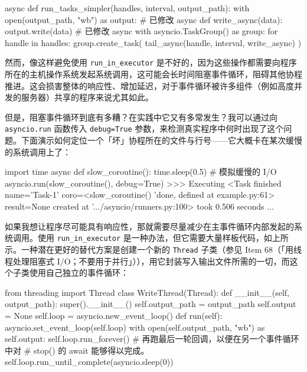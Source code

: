 \begin{codebox}[python]
async def run_tasks_simpler(handles, interval, output_path):
    with open(output_path, "wb") as output:  # 已修改
        async def write_async(data):
            output.write(data)               # 已修改
        async with asyncio.TaskGroup() as group:
            for handle in handles:
                group.create_task(
                    tail_async(handle, interval, write_async)
                )
\end{codebox}

然而，像这样避免使用 \texttt{run\_in\_executor} 是不好的，因为这些操作都需要向程序所在的主机操作系统发起系统调用，这可能会长时间阻塞事件循环，阻碍其他协程推进。这会损害整体的响应性、增加延迟，对于事件循环被许多组件（例如高度并发的服务器）共享的程序来说尤其如此。

但是，阻塞事件循环到底有多糟？在实践中它又有多常发生？我可以通过向 \texttt{asyncio.run} 函数传入 \texttt{debug=True} 参数，来检测真实程序中何时出现了这个问题。下面演示如何定位一个「坏」协程所在的文件与行号——它大概卡在某次缓慢的系统调用上了：

\begin{codebox}[python]
import time
async def slow_coroutine():
    time.sleep(0.5)  # 模拟缓慢的 I/O
asyncio.run(slow_coroutine(), debug=True)
>>>
Executing <Task finished name='Task-1' coro=<slow_coroutine()
'done, defined at example.py:61> result=None created at
'.../asyncio/runners.py:100> took 0.506 seconds
...
\end{codebox}

如果我想让程序尽可能具有响应性，那就需要尽量减少在主事件循环内部发起的系统调用。使用 \texttt{run\_in\_executor} 是一种办法，但它需要大量样板代码，如上所示。一种潜在更好的替代方案是创建一个新的 \texttt{Thread} 子类（参见 Item 68（「用线程处理阻塞式 I/O；不要用于并行」）），用它封装写入输出文件所需的一切，而这个子类使用自己独立的事件循环：

\begin{codebox}[python]
from threading import Thread
class WriteThread(Thread):
    def __init__(self, output_path):
        super().__init__()
        self.output_path = output_path
        self.output = None
        self.loop = asyncio.new_event_loop()
    def run(self):
        asyncio.set_event_loop(self.loop)
        with open(self.output_path, "wb") as self.output:
            self.loop.run_forever()
        # 再跑最后一轮回调，以便在另一个事件循环中对
        # stop() 的 await 能够得以完成。
        self.loop.run_until_complete(asyncio.sleep(0))
\end{codebox}

